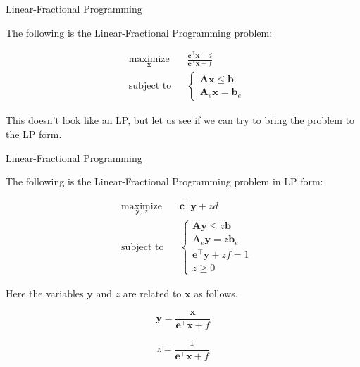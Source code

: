 \documentclass{beamer}
\begin{document}
\begin{frame}{Linear-Fractional Programming}
	\begin{flushleft}
		
		The following is the Linear-Fractional Programming problem:
		
		\begin{equation}
			\begin{aligned}
				& \underset{\mathbf{x}}{\text{maximize}}
				& & \frac{\mathbf{c}^\top \mathbf{x} + d}{\mathbf{e}^\top \mathbf{x} + f} \\
				& \text{subject to}
				& & 
				 \begin{cases}
				 	\mathbf{A} \mathbf{x} \leq \mathbf{b} \\
				 	\mathbf{A}_e \mathbf{x} = \mathbf{b}_e
				 \end{cases}
			\end{aligned}
		\end{equation}
		
		This doesn't look like an LP, but let us see if we can try to bring the problem to the LP form. 
		
	\end{flushleft}
\end{frame}



\begin{frame}{Linear-Fractional Programming}
	\begin{flushleft}
		
		The following is the Linear-Fractional Programming problem in LP form:
		
		\begin{equation}
			\begin{aligned}
				& \underset{\mathbf{y}, \ z}{\text{maximize}}
				& & \mathbf{c}^\top \mathbf{y} + z d \\
				& \text{subject to}
				& & 
				\begin{cases}
					\mathbf{A} \mathbf{y} \leq z \mathbf{b} \\
					\mathbf{A}_e \mathbf{y} = z \mathbf{b}_e \\
					\mathbf{e}^\top \mathbf{y} + z f = 1 \\
					z \geq 0
				\end{cases}
			\end{aligned}
		\end{equation}
		
		Here the variables $\mathbf{y}$ and $z$ are related to $\mathbf{x}$ as follows.
		
		\begin{equation}
			\mathbf{y} = \frac{\mathbf{x}}{\mathbf{e}^\top \mathbf{x} + f}
		\end{equation}
	 
		\begin{equation}
			z = \frac{1}{\mathbf{e}^\top \mathbf{x} + f}
		\end{equation} 
		
	\end{flushleft}
\end{frame}
\end{document}
